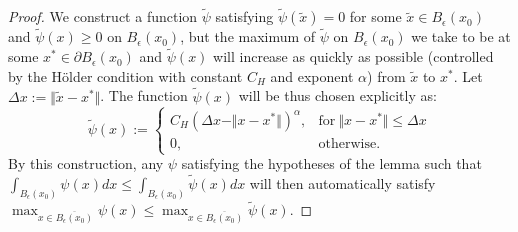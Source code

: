 \documentclass{amsart}
\theoremstyle{lemma}
\theoremstyle{remark}
\begin{document}
\begin{proof}
We construct a function $\tilde{\psi}$ satisfying $\tilde{\psi}(\tilde{x}) = 0$ for some $\tilde{x} \in B_{\epsilon}(x_0)$ and $\tilde{\psi}(x) \geq 0$ on $B_{\epsilon}(x_0)$, but the maximum of $\tilde{\psi}$ on $B_{\epsilon}(x_0)$ we take to be at some $x^{*} \in \partial B_{\epsilon}(x_0)$ and $\tilde{\psi}(x)$ will increase as quickly as possible (controlled by the H\"{o}lder condition with constant $C_{H}$ and exponent $\alpha$) from $\tilde{x}$ to $x^{*}$. Let $\Delta x := \Vert \tilde{x} - x^{*} \Vert$. The function $\tilde{\psi}(x)$ will be thus chosen explicitly as:
\begin{equation}
\tilde{\psi}(x) :=
\begin{cases}
C_{H}(\Delta x - \Vert x - x^{*} \Vert)^{\alpha}, &\text{for} \ \Vert x - x^{*} \Vert \leq \Delta x \\
0, &\text{otherwise}.
\end{cases}
\end{equation}
By this construction, any $\psi$ satisfying the hypotheses of the lemma such that $\int_{B_{\epsilon}(x_0)} \psi(x)dx \leq \int_{B_{\epsilon}(x_0)} \tilde{\psi}(x)dx$ will then automatically satisfy $\max_{x \in \overline{B_{\epsilon}(x_0)}} \psi(x) \leq \max_{x \in \overline{B_{\epsilon}(x_0)}} \tilde{\psi}(x)$.


\end{proof}
\end{document}
